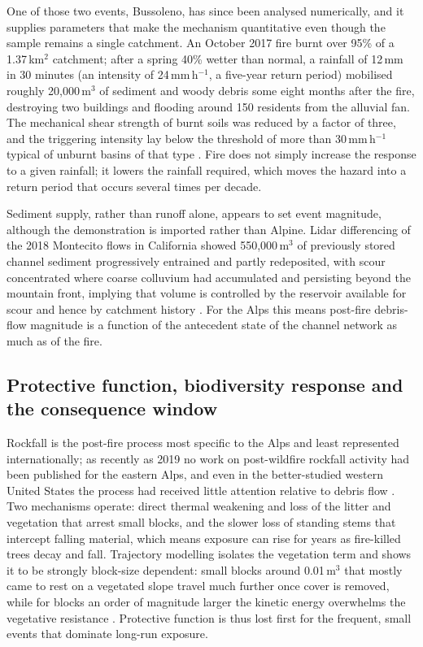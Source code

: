 \documentclass[11pt,a4paper]{article}
\begin{document}
One of those two events, Bussoleno, has since been analysed numerically, and it supplies parameters that make the mechanism quantitative even though the sample remains a single catchment. An October 2017 fire burnt over 95\% of a 1.37\,km$^2$ catchment; after a spring 40\% wetter than normal, a rainfall of 12\,mm in 30 minutes (an intensity of 24\,mm\,h$^{-1}$, a five-year return period) mobilised roughly 20{,}000\,m$^3$ of sediment and woody debris some eight months after the fire, destroying two buildings and flooding around 150 residents from the alluvial fan. The mechanical shear strength of burnt soils was reduced by a factor of three, and the triggering intensity lay below the threshold of more than 30\,mm\,h$^{-1}$ typical of unburnt basins of that type \citep{laporta_postwildfire_2025}. Fire does not simply increase the response to a given rainfall; it lowers the rainfall required, which moves the hazard into a return period that occurs several times per decade.

Sediment supply, rather than runoff alone, appears to set event magnitude, although the demonstration is imported rather than Alpine. Lidar differencing of the 2018 Montecito flows in California showed 550{,}000\,m$^3$ of previously stored channel sediment progressively entrained and partly redeposited, with scour concentrated where coarse colluvium had accumulated and persisting beyond the mountain front, implying that volume is controlled by the reservoir available for scour and hence by catchment history \citep{morell_sediment_2021}. For the Alps this means post-fire debris-flow magnitude is a function of the antecedent state of the channel network as much as of the fire.

\subsection{Protective function, biodiversity response and the consequence window}

Rockfall is the post-fire process most specific to the Alps and least represented internationally; as recently as 2019 no work on post-wildfire rockfall activity had been published for the eastern Alps, and even in the better-studied western United States the process had received little attention relative to debris flow \citep{melzner_brief_2019}. Two mechanisms operate: direct thermal weakening and loss of the litter and vegetation that arrest small blocks, and the slower loss of standing stems that intercept falling material, which means exposure can rise for years as fire-killed trees decay and fall. Trajectory modelling isolates the vegetation term and shows it to be strongly block-size dependent: small blocks around 0.01\,m$^3$ that mostly came to rest on a vegetated slope travel much further once cover is removed, while for blocks an order of magnitude larger the kinetic energy overwhelms the vegetative resistance \citep{asteriou_assessing_2025}. Protective function is thus lost first for the frequent, small events that dominate long-run exposure.
\end{document}
